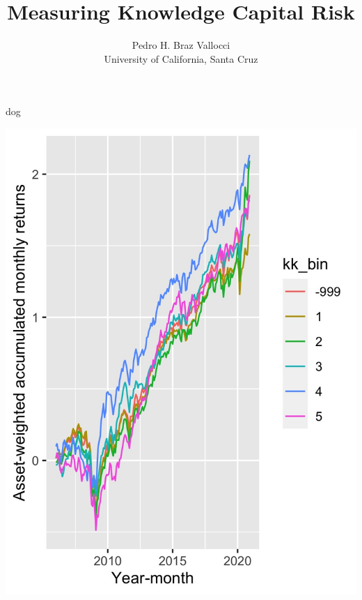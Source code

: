 \documentclass[11pt]{article}
\begin{document}
\title{Measuring Knowledge Capital Risk} %
\author{\sffamily Pedro H. Braz Vallocci \\ \sffamily University of California, Santa Cruz} %

\maketitle %

\doublespacing %

dog

% 
\includegraphics{awamr.jpg} %
\end{document}
